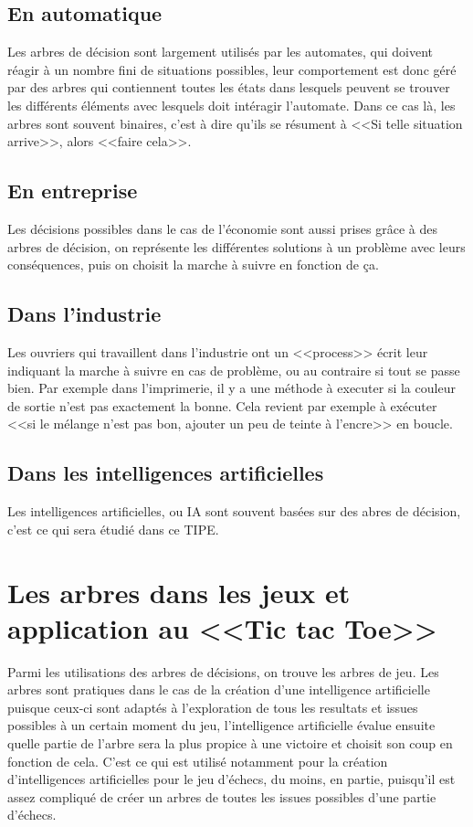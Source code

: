 \documentclass{article}
\begin{document}
\subsection{En automatique}

Les arbres de décision sont largement utilisés par les automates,
 qui doivent réagir à un nombre fini de situations possibles,
leur comportement est donc géré par des arbres qui contiennent
 toutes les états dans lesquels peuvent se trouver les différents
éléments avec lesquels doit intéragir l'automate.
Dans ce cas là, les arbres sont souvent binaires,
c'est à dire qu'ils se résument à <<Si telle situation arrive>>, alors <<faire
cela>>.

\subsection{En entreprise}

Les décisions possibles dans le cas de l'économie sont aussi prises grâce à des
arbres de décision,
on représente les différentes solutions à un problème avec leurs conséquences,
puis on choisit
la marche à suivre en fonction de ça.

\subsection{Dans l'industrie}

Les ouvriers qui travaillent dans l'industrie ont un <<process>> écrit
leur indiquant la marche à suivre en cas de problème,
ou au contraire si tout se passe bien. Par exemple dans l'imprimerie, il y a une
méthode à executer si la
couleur de sortie n'est pas exactement la bonne.
Cela revient par exemple à exécuter <<si le mélange n'est pas bon, ajouter un peu de
teinte à l'encre>> en boucle.


\subsection{Dans les intelligences artificielles}

Les intelligences artificielles, ou IA sont souvent basées sur des abres de
décision, c'est ce qui sera étudié dans ce TIPE. 

\section{Les arbres dans les jeux et application au <<Tic tac Toe>>}

Parmi les utilisations des arbres de décisions, on trouve les arbres de jeu.
Les arbres sont pratiques dans le cas de la création d'une intelligence
artificielle puisque
ceux-ci sont adaptés à l'exploration
de tous les resultats et issues possibles à un certain moment du jeu,
l'intelligence artificielle évalue ensuite quelle partie de l'arbre sera la plus
propice à une victoire et choisit son coup en fonction de cela. C'est ce qui est
utilisé notamment pour la création d'intelligences
artificielles pour le jeu d'échecs, du moins, en partie, puisqu'il est assez compliqué de créer
 un arbres de toutes les issues possibles d'une partie d'échecs.
\end{document}
